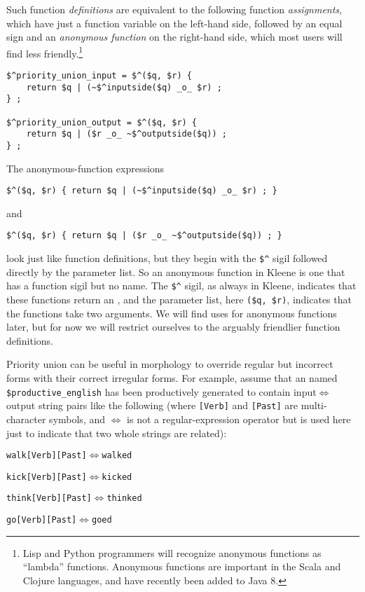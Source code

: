 \noindent
Such function \emph{definitions} are equivalent to the following function
\emph{assignments}, which have just a function variable on the left-hand side, followed by an equal sign
and an \emph{anonymous function} on the right-hand side, which most users will find less
friendly.\footnote{Lisp and Python programmers
will recognize anonymous functions as ``lambda'' functions.  Anonymous functions are important in the Scala
and Clojure languages, and have recently been added to Java 8.}  

\begin{Verbatim}
$^priority_union_input = $^($q, $r) {
	return $q | (~$^inputside($q) _o_ $r) ;
} ;

$^priority_union_output = $^($q, $r) {
	return $q | ($r _o_ ~$^outputside($q)) ;
} ;
\end{Verbatim}

\noindent
The anonymous-function expressions

\begin{Verbatim}
$^($q, $r) { return $q | (~$^inputside($q) _o_ $r) ; }
\end{Verbatim}

\noindent
and

\begin{Verbatim}
$^($q, $r) { return $q | ($r _o_ ~$^outputside($q)) ; }
\end{Verbatim}


\noindent
look just like function definitions, but they begin with the \verb!$^! sigil followed directly
by the parameter list. So an anonymous function in Kleene is one that has a function sigil but 
no name.  The \verb!$^! sigil, as always in Kleene,
indicates that these functions return an \fsm{}, and the
parameter list, here \verb!($q, $r)!, indicates that the functions take two \fsm{} arguments.  We will find
uses for anonymous functions later, but for now we will restrict ourselves to the arguably friendlier function
definitions.

Priority union can be useful in morphology to override regular but incorrect
forms with their correct irregular forms.  For example, assume that
an \fsm{} named \verb!$productive_english! has been productively generated to contain
input$\Longleftrightarrow$output
string pairs like the following (where \verb![Verb]! and \verb![Past]! are
multi-character symbols, and $\Longleftrightarrow$ is not a regular-expression
operator but is used here just to indicate that two whole strings are related):

\begin{alltt}
walk[Verb][Past] \(\Longleftrightarrow\) walked

kick[Verb][Past] \(\Longleftrightarrow\) kicked

think[Verb][Past] \(\Longleftrightarrow\) thinked

go[Verb][Past] \(\Longleftrightarrow\) goed
\end{alltt}

